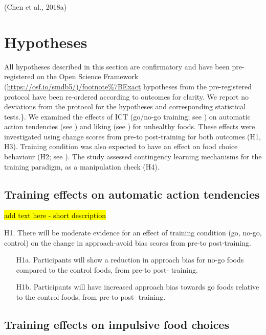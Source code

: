 \documentclass[man,floatsintext]{apa6}
\begin{document}
(Chen et al., 2018a)

\hypertarget{hypotheses}{%
\section{Hypotheses}\label{hypotheses}}

All hypotheses described in this section are confirmatory and have been pre-registered on the Open Science Framework (\url{https://osf.io/smdb5/)/footnote\%7BExact} hypotheses from the pre-registered protocol have been re-ordered according to outcomes for clarity. We report no deviations from the protocol for the hypotheses and corresponding statistical tests.\}. We examined the effects of ICT (go/no-go training; see \textit{}) on automatic action tendencies (see \textit{}) and liking (see \textit{}) for unhealthy foods. These effects were investigated using change scores from pre-to post-training for both outcomes (H1, H3). Training condition was also expected to have an effect on food choice behaviour (H2; see \textit{}). The study assessed contingency learning mechanisms for the training paradigm, as a manipulation check (H4).

\hypertarget{training-effects-on-automatic-action-tendencies}{%
\subsection{Training effects on automatic action tendencies}\label{training-effects-on-automatic-action-tendencies}}

\hl{add text here - short description}

\noindent H1. There will be moderate evidence for an effect of training condition (go, no-go, control) on the change in approach-avoid bias scores from pre-to post-training.

\begin{itemize}
\item[H1a.] Participants will show a reduction in approach bias for no-go foods compared to the control foods, from pre-to post- training.
\item[H1b.] Participants will have increased approach bias towards go foods relative to the control foods, from pre-to post- training.
\end{itemize}

\hypertarget{training-effects-on-impulsive-food-choices}{%
\subsection{Training effects on impulsive food choices}\label{training-effects-on-impulsive-food-choices}}
\end{document}

